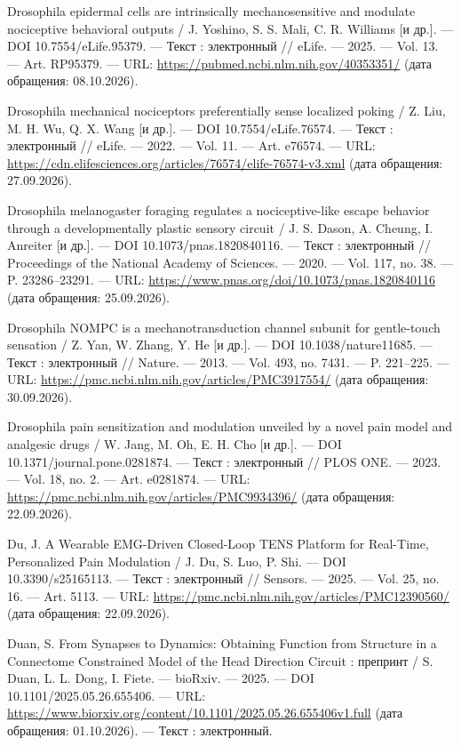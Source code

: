 \begin{list}{}{\setlength{\leftmargin}{10mm}\setlength{\labelwidth}{8mm}\setlength{\labelsep}{2mm}\setlength{\itemsep}{0pt}\setlength{\parsep}{0pt}\setlength{\topsep}{0pt}}
\item[97.] Drosophila epidermal cells are intrinsically mechanosensitive and modulate nociceptive behavioral outputs / J. Yoshino, S. S. Mali, C. R. Williams [и др.]. — DOI 10.7554/eLife.95379. — Текст : электронный // eLife. — 2025. — Vol. 13. — Art. RP95379. — URL: \url{https://pubmed.ncbi.nlm.nih.gov/40353351/} (дата обращения: 08.10.2026).
\item[98.] Drosophila mechanical nociceptors preferentially sense localized poking / Z. Liu, M. H. Wu, Q. X. Wang [и др.]. — DOI 10.7554/eLife.76574. — Текст : электронный // eLife. — 2022. — Vol. 11. — Art. e76574. — URL: \url{https://cdn.elifesciences.org/articles/76574/elife-76574-v3.xml} (дата обращения: 27.09.2026).
\item[99.] Drosophila melanogaster foraging regulates a nociceptive-like escape behavior through a developmentally plastic sensory circuit / J. S. Dason, A. Cheung, I. Anreiter [и др.]. — DOI 10.1073/pnas.1820840116. — Текст : электронный // Proceedings of the National Academy of Sciences. — 2020. — Vol. 117, no. 38. — P. 23286–23291. — URL: \url{https://www.pnas.org/doi/10.1073/pnas.1820840116} (дата обращения: 25.09.2026).
\item[100.] Drosophila NOMPC is a mechanotransduction channel subunit for gentle-touch sensation / Z. Yan, W. Zhang, Y. He [и др.]. — DOI 10.1038/nature11685. — Текст : электронный // Nature. — 2013. — Vol. 493, no. 7431. — P. 221–225. — URL: \url{https://pmc.ncbi.nlm.nih.gov/articles/PMC3917554/} (дата обращения: 30.09.2026).
\item[101.] Drosophila pain sensitization and modulation unveiled by a novel pain model and analgesic drugs / W. Jang, M. Oh, E. H. Cho [и др.]. — DOI 10.1371/journal.pone.0281874. — Текст : электронный // PLOS ONE. — 2023. — Vol. 18, no. 2. — Art. e0281874. — URL: \url{https://pmc.ncbi.nlm.nih.gov/articles/PMC9934396/} (дата обращения: 22.09.2026).
\item[102.] Du, J. A Wearable EMG-Driven Closed-Loop TENS Platform for Real-Time, Personalized Pain Modulation / J. Du, S. Luo, P. Shi. — DOI 10.3390/s25165113. — Текст : электронный // Sensors. — 2025. — Vol. 25, no. 16. — Art. 5113. — URL: \url{https://pmc.ncbi.nlm.nih.gov/articles/PMC12390560/} (дата обращения: 22.09.2026).
\item[103.] Duan, S. From Synapses to Dynamics: Obtaining Function from Structure in a Connectome Constrained Model of the Head Direction Circuit : препринт / S. Duan, L. L. Dong, I. Fiete. — bioRxiv. — 2025. — DOI 10.1101/2025.05.26.655406. — URL: \url{https://www.biorxiv.org/content/10.1101/2025.05.26.655406v1.full} (дата обращения: 01.10.2026). — Текст : электронный.

\end{list}

